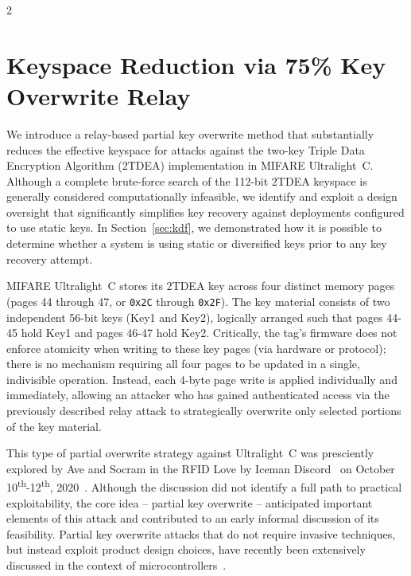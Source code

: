\documentclass[10pt,letterpaper]{article}
\begin{document}
\begin{multicols}{2}
\section{Keyspace Reduction via 75\% Key Overwrite Relay}
\label{sec:reduce}

We introduce a relay-based partial key overwrite method that substantially reduces the effective keyspace for attacks against the two-key Triple Data Encryption Algorithm (2TDEA) implementation in MIFARE Ultralight~C. Although a complete brute-force search of the 112-bit 2TDEA keyspace is generally considered computationally infeasible, we identify and exploit a design oversight that significantly simplifies key recovery against deployments configured to use static keys. In Section~\ref{sec:kdf}, we demonstrated how it is possible to determine whether a system is using static or diversified keys prior to any key recovery attempt.

MIFARE Ultralight~C stores its 2TDEA key across four distinct memory pages (pages 44 through 47, or \texttt{0x2C} through \texttt{0x2F}). The key material consists of two independent 56-bit keys (Key1 and Key2), logically arranged such that pages 44-45 hold Key1 and pages 46-47 hold Key2. Critically, the tag's firmware does not enforce atomicity when writing to these key pages (via hardware or protocol); there is no mechanism requiring all four pages to be updated in a single, indivisible operation. Instead, each 4-byte page write is applied individually and immediately, allowing an attacker who has gained authenticated access via the previously described relay attack to strategically overwrite only selected portions of the key material.

This type of partial overwrite strategy against Ultralight~C was presciently explored by Ave and Socram in the RFID Love by Iceman Discord~\cite{discord} on October 10\textsuperscript{th}-12\textsuperscript{th}, 2020~\cite{discord_pko}. Although the discussion did not identify a full path to practical exploitability, the core idea -- partial key overwrite -- anticipated important elements of this attack and contributed to an early informal discussion of its feasibility. Partial key overwrite attacks that do not require invasive techniques, but instead exploit product design choices, have recently been extensively discussed in the context of microcontrollers~\cite{article3940}.


\end{multicols}
\end{document}
